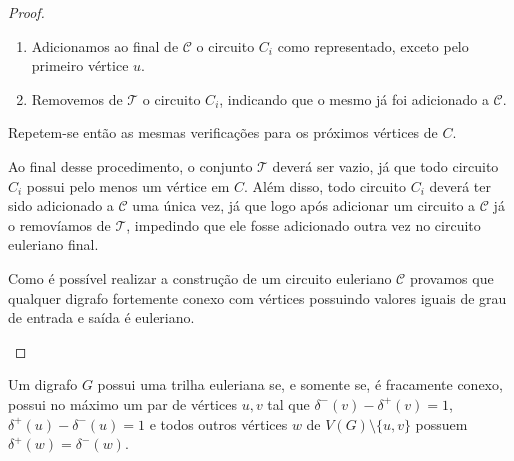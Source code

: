 \begin{proof}
\begin{enumerate}
\begin{tcolorbox}
\begin{enumerate}
                    \item Adicionamos ao final de $\mathcal{C}$ o circuito $C_i$ como representado, exceto pelo primeiro vértice $u$. 

                    \item Removemos de $\mathcal{T}$ o circuito $C_i$, indicando que o mesmo já foi adicionado a $\mathcal{C}$.

                \end{enumerate}

                Repetem-se então as mesmas verificações para os próximos vértices de $C$.
            \end{tcolorbox}


Ao final desse procedimento, o conjunto $\mathcal{T}$ deverá ser vazio, já que todo circuito $C_i$ possui pelo menos um vértice em $C$. 
Além disso, todo circuito $C_i$ deverá ter sido adicionado a $\mathcal{C}$ uma única vez, já que logo após adicionar um circuito a $\mathcal{C}$ já o removíamos de $\mathcal{T}$, impedindo que ele fosse adicionado outra vez no circuito euleriano final.

Como é possível realizar a construção de um circuito euleriano $\mathcal{C}$ provamos que qualquer digrafo fortemente conexo com vértices possuindo valores iguais de grau de entrada e saída é euleriano.

    \end{enumerate}
\end{proof}

\begin{corollary} 
    Um digrafo $G$ possui uma trilha euleriana se, e somente se, é fracamente conexo, possui no máximo um par de vértices $u, v$ tal que $\delta^-(v) - \delta^+(v) = 1$, $\delta^+(u) - \delta^-(u) = 1$ e todos outros vértices $w$ de $V(G) \setminus \{u, v\}$ possuem $\delta^+(w) = \delta^-(w)$.
    \label{corollary-euler-digraph}
\end{corollary}

